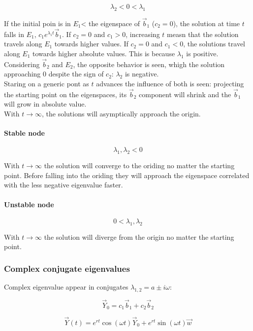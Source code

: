       $$\lambda_2< 0 < \lambda_1$$

      If the initial poin is in $E_1$< the eigenspace of $\vec{b}_1$ ($c_2 = 0$), the solution at time $t$ falls in $E_1$, $c_1e^{\lambda_1 t}\vec{b}_1$.
      If $c_2= 0$ and $c_1>0$, increasing $t$ measn that the solution travels along $E_1$ towards higher values.
      If $c_2 = 0$ and $c_1 < 0$, the solutions travel along $E_1$ towards higher absolute values.
      This is because $\lambda_1$ is positive.\\
      Considering $\vec{b}_2$ and $E_2$, the opposite behavior is seen, whigh the solution approaching $0$ despite the sign of $c_2$: $\lambda_2$ is negative.\\
      Staring on a generic pont as $t$ advances the influence of both is seen: projecting the starting point on the eigenspaces, its $\vec{b}_2$ component will shrink and the $\vec{b}_1$ will grow in absolute value.\\
      With $t\to \infty$, the solutions will asymptically approach the origin.

      \paragraph{Stable node}

      $$\lambda_1, \lambda_2 < 0$$

      With $t\to\infty$ the solution will converge to the oriding no matter the starting point.
      Before falling into the oriding they will approach the eigenspace correlated with the less negative eigenvalue faster.

      \paragraph{Unstable node}

      $$0 < \lambda_1, \lambda_2$$

      With $t\to\infty$ the solution will diverge from the origin no matter the starting point.

    \subsubsection{Complex conjugate eigenvalues}
    Complex eigenvalue appear in conjugates $\lambda_{1,2} = a\pm i\omega$:

    $$\vec{Y}_0 = c_1\vec{b}_1 + c_2\vec{b}_2$$

    $$\vec{Y}(t) = e^{rt}\cos(\omega t)\vec{Y}_0 + e^{rt}\sin(\omega t)\vec{w}$$

